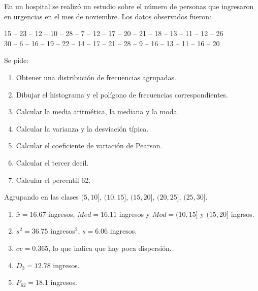 {En un hospital se realizó un estudio sobre el número de personas que ingresaron en urgencias en el mes de noviembre. Los datos observados fueron:
\begin{center}
15 -- 23 -- 12 -- 10 -- 28 -- 7 -- 12 -- 17 -- 20 -- 21 -- 18 -- 13 -- 11 -- 12 -- 26 \\
30 -- 6 -- 16 -- 19 -- 22 -- 14 -- 17 -- 21 -- 28 -- 9 -- 16 -- 13 -- 11 -- 16 -- 20
\end{center}
Se pide:
\begin{enumerate}
\item  Obtener una distribución de frecuencias agrupadas.
\item  Dibujar el histograma y el polígono de frecuencias correspondientes.
\item  Calcular la media aritmética, la mediana y la moda.
\item  Calcular la varianza y la desviación típica.
\item  Calcular el coeficiente de variación de Pearson.
\item  Calcular el tercer decil.
\item  Calcular el percentil 62.
\end{enumerate}
}
{
Agrupando en las clases $(5,10]$, $(10,15]$, $(15,20]$, $(20,25]$, $(25,30]$.
\begin{enumerate}[start=3]
\item $ \bar{x} = 16.67$ ingresos, $Med =16.11$ ingresos y $Mod= (10,15]$ y $(15,20]$ ingrsos.
\item $s^2 = 36.75$ ingresos$^2$, $s= 6.06$ ingresos.
\item $cv = 0.365$, lo que indica que hay poca dispersión. 
\item $D_3=12.78$ ingresos.
\item $P_{62}=18.1$ ingresos.
\end{enumerate}
}
{}


